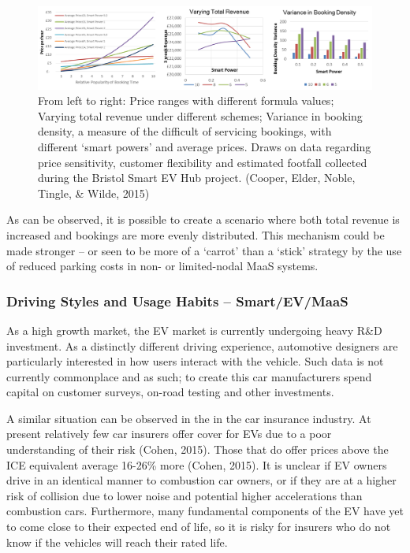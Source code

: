 \documentclass[journal]{IEEEtran}
\begin{document}
\begin{figure}[!htb]
\centering
\includegraphics[width=\textwidth]{images/smartpricegraphs.png}
\caption{From left to right: Price ranges with different formula
  values; Varying total revenue under different schemes; Variance in
  booking density, a measure of the difficult of servicing bookings,
  with different ‘smart powers’ and average prices. Draws on data
  regarding price sensitivity, customer flexibility and estimated
  footfall collected during the Bristol Smart EV Hub project. (Cooper,
  Elder, Noble, Tingle, \& Wilde, 2015)}
\label{fig:smartpricegraphs}
\end{figure}

As can be observed, it is possible to create a scenario where both
total revenue is increased and bookings are more evenly
distributed. This mechanism could be made stronger -- or seen to be
more of a `carrot' than a `stick' strategy by the use of reduced
parking costs in non- or limited-nodal MaaS systems.

\subsubsection{Driving Styles and Usage Habits -- Smart/EV/MaaS} 

As a high growth market, the EV market is currently undergoing heavy
R\&D investment. As a distinctly different driving experience,
automotive designers are particularly interested in how users interact
with the vehicle. Such data is not currently commonplace and as such;
to create this car manufacturers spend capital on customer surveys,
on-road testing and other investments.

A similar situation can be observed in the in the car insurance
industry. At present relatively few car insurers offer cover for EVs
due to a poor understanding of their risk (Cohen, 2015). Those that do
offer prices above the ICE equivalent average 16-26\% more (Cohen,
2015). It is unclear if EV owners drive in an identical manner to
combustion car owners, or if they are at a higher risk of collision
due to lower noise and potential higher accelerations than combustion
cars. Furthermore, many fundamental components of the EV have yet to
come close to their expected end of life, so it is risky for insurers
who do not know if the vehicles will reach their rated life.
\end{document}
